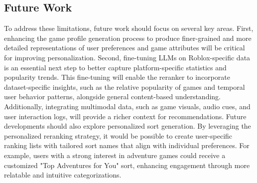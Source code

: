 \subsection{Future Work}
To address these limitations, future work should focus on several key areas. First, enhancing the game profile generation process to produce finer-grained and more detailed representations of user preferences and game attributes will be critical for improving personalization. Second, fine-tuning LLMs on Roblox-specific data is an essential next step to better capture platform-specific statistics and popularity trends. This fine-tuning will enable the reranker to incorporate dataset-specific insights, such as the relative popularity of games and temporal user behavior patterns, alongside general content-based understanding. Additionally, integrating multimodal data, such as game visuals, audio cues, and user interaction logs, will provide a richer context for recommendations. Future developments should also explore personalized sort generation. By leveraging the personalized reranking strategy, it would be possible to create user-specific ranking lists with tailored sort names that align with individual preferences. For example, users with a strong interest in adventure games could receive a customized "Top Adventures for You" sort, enhancing engagement through more relatable and intuitive categorizations.
